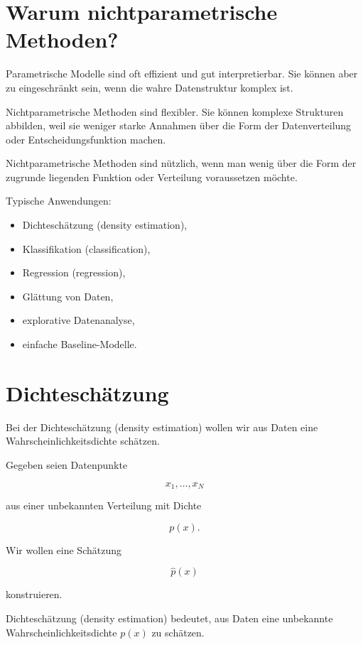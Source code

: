 \section{Warum nichtparametrische Methoden?}

Parametrische Modelle sind oft effizient und gut interpretierbar.
Sie können aber zu eingeschränkt sein, wenn die wahre Datenstruktur komplex ist.

Nichtparametrische Methoden sind flexibler.
Sie können komplexe Strukturen abbilden, weil sie weniger starke Annahmen über die Form der Datenverteilung oder Entscheidungsfunktion machen.

\begin{conceptbox}
Nichtparametrische Methoden sind nützlich, wenn man wenig über die Form der zugrunde liegenden Funktion oder Verteilung voraussetzen möchte.
\end{conceptbox}

Typische Anwendungen:

\begin{itemize}
    \item Dichteschätzung (density estimation),
    \item Klassifikation (classification),
    \item Regression (regression),
    \item Glättung von Daten,
    \item explorative Datenanalyse,
    \item einfache Baseline-Modelle.
\end{itemize}

\section{Dichteschätzung}

Bei der Dichteschätzung (density estimation) wollen wir aus Daten eine Wahrscheinlichkeitsdichte schätzen.

Gegeben seien Datenpunkte

\[
    x_1,\dots,x_N
\]

aus einer unbekannten Verteilung mit Dichte

\[
    p(x).
\]

Wir wollen eine Schätzung

\[
    \hat{p}(x)
\]

konstruieren.

\begin{definitionbox}
Dichteschätzung (density estimation) bedeutet, aus Daten eine unbekannte Wahrscheinlichkeitsdichte \(p(x)\) zu schätzen.
\end{definitionbox}

